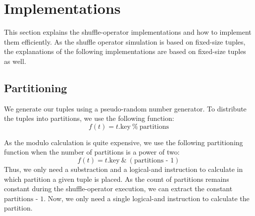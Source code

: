 
\chapter{Implementations}\label{chapter:implementations}
This section explains the shuffle-operator implementations and how to implement them efficiently.
As the shuffle operator simulation is based on fixed-size tuples, the explanations of the following implementations are based on fixed-size tuples as well.

\section{Partitioning}
We generate our tuples using a pseudo-random number generator.
To distribute the tuples into partitions, we use the following function:
\begin{equation}
  f(t) = t\textrm{.key}\ \%\ \textrm{partitions}
\end{equation}

As the modulo calculation is quite expensive, we use the following partitioning function when the number of partitions is a power of two:
\begin{equation}
  f(t) = t\textrm{.key}\ \&\ (\textrm{partitions - 1})
\end{equation}
Thus, we only need a substraction and a logical-and instruction to calculate in which partition a given tuple is placed.
As the count of partitions remains constant during the shuffle-operator execution, we can extract the constant $\textrm{partitions - 1}$.
Now, we only need a single logical-and instruction to calculate the partition.
